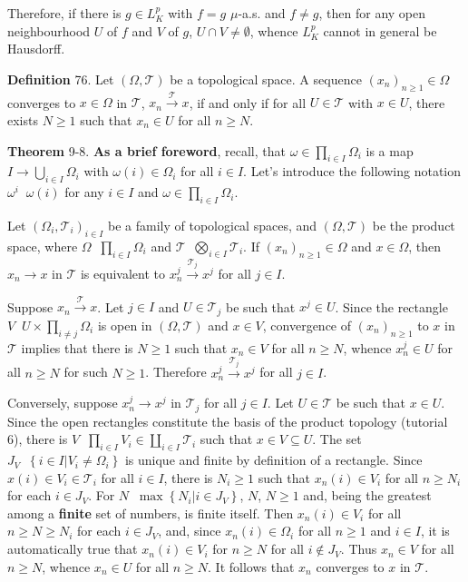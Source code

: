 \documentclass[a4paper]{article}
\newcommand{\obj}[1]{\left\{ #1 \right \}}
\newcommand{\brac}[1]{\left ( #1 \right )}
\newcommand{\induc}[1]{\left . #1 \right \vert}
\newcommand{\Tcal}{\mathcal{T}}
\newcommand{\defn}{\mathop{\overset{\Delta}{=}}\nolimits}
\begin{document}
Therefore, if there is $g\in L^p_K$ with $f=g$ $\mu$-a.s. and $f\neq g$, then for any open neighbourhood $U$ of $f$ and $V$ of $g$, $U\cap V\neq \emptyset$, whence $L^p_K$ cannot in general be Hausdorff.

\noindent \textbf{Definition} 76.
Let $\brac{\Omega,\Tcal}$ be a topological space. A sequence $\brac{x_n}_{n\geq 1}\in \Omega$ converges to $x\in \Omega$ in $\Tcal$, $x_n\overset{\Tcal}{\to} x$, if and only if for all $U\in \Tcal$ with $x\in U$, there exists $N\geq 1$ such that $x_n\in U$ for all $n\geq N$.

\label{thm:prod_conv} \noindent \textbf{Theorem} 9-8.
\textbf{As a brief foreword}, recall, that $\omega\in \prod_{i\in I} \Omega_i$ is a map $I\to \bigcup_{i\in I} \Omega_i$ with $\omega\brac{i}\in \Omega_i$ for all $i\in I$. Let's introduce the following notation $\omega^i \defn \omega\brac{i}$ for any $i\in I$ and $\omega\in \prod_{i\in I} \Omega_i$.

Let $\brac{\Omega_i, \Tcal_i}_{i\in I}$ be a family of topological spaces, and $\brac{\Omega, \Tcal}$ be the product space, where $\Omega\defn \prod_{i\in I} \Omega_i$ and $\Tcal \defn \bigotimes_{i\in I} \Tcal_i$. If $\brac{x_n}_{n\geq 1}\in \Omega$ and $x\in \Omega$, then $x_n \to x$ in $\Tcal$ is equivalent to $x_n^j\overset{\Tcal_j}{\to}x^j$ for all $j\in I$.

Suppose $x_n \overset{\Tcal}{\to} x$. Let $j\in I$ and $U\in \Tcal_j$ be such that $x^j\in U$. Since the rectangle $V\defn U \times \prod_{i\neq j} \Omega_i$ is open in $\brac{\Omega, \Tcal}$ and $x\in V$, convergence of $\brac{x_n}_{n\geq 1}$ to $x$ in $\Tcal$ implies that there is $N\geq 1$ such that $x_n\in V$ for all $n\geq N$, whence $x_n^j\in U$ for all $n\geq N$ for such $N\geq 1$. Therefore $x_n^j\overset{\Tcal_j}{\to}x^j$ for all $j\in I$.

Conversely, suppose $x_n^j\to x^j$ in $\Tcal_j$ for all $j\in I$. Let $U\in\Tcal$ be such that $x\in U$. Since the open rectangles constitute the basis of the product topology (tutorial 6), there is $V\defn \prod_{i\in I} V_i \in \coprod_{i\in I} \Tcal_i$ such that $x\in V\subseteq U$. The set $J_V\defn \obj{\induc{i\in I} V_i \neq \Omega_i}$ is unique and finite by definition of a rectangle. Since $x\brac{i}\in V_i\in \Tcal_i$ for all $i\in I$, there is $N_i \geq 1$ such that $x_n\brac{i}\in V_i$ for all $n\geq N_i$ for each $i\in J_V$. For $N\defn \max\obj{\induc{N_i} i\in J_V}$, $N$, $N\geq 1$ and, being the greatest among a \textbf{finite} set of numbers, is finite itself. Then $x_n\brac{i}\in V_i$ for all $n\geq N \geq N_i$ for each $i\in J_V$, and, since $x_n\brac{i}\in \Omega_i$ for all $n\geq 1$ and $i\in I$, it is automatically true that $x_n\brac{i}\in V_i$ for $n\geq N$ for all $i\notin J_V$. Thus $x_n\in V$ for all $n\geq N$, whence $x_n\in U$ for all $n\geq N$. It follows that $x_n$ converges to $x$ in $\Tcal$.\\
\end{document}
